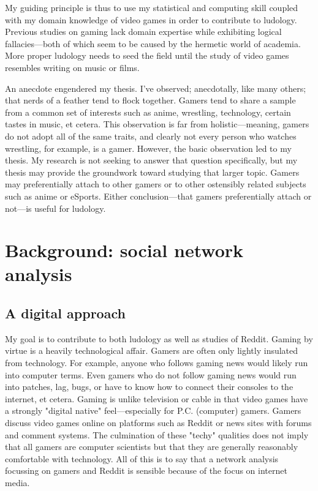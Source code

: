 \documentclass[12pt, a4paper]{article}
\begin{document}
My guiding principle is thus to use my statistical and computing skill coupled with my domain knowledge of video games in order to contribute to ludology. Previous studies on gaming lack domain expertise while exhibiting logical fallacies---both of which seem to be caused by the hermetic world of academia. More proper ludology needs to seed the field until the study of video games resembles writing on music or films. 

An anecdote engendered my thesis. I've observed; anecdotally, like many others; that nerds of a feather tend to flock together. Gamers tend to share a sample from a common set of interests such as anime, wrestling, technology, certain tastes in music, et cetera. This observation is far from holistic---meaning, gamers do not adopt all of the same traits, and clearly not every person who watches wrestling, for example, is a gamer. However, the basic observation led to my thesis. My research is not seeking to answer that question specifically, but my thesis may provide the groundwork toward studying that larger topic. Gamers may preferentially attach to other gamers or to other ostensibly related subjects such as anime or eSports. Either conclusion---that gamers preferentially attach or not---is useful for ludology. 

\section{Background: social network analysis}

\subsection{A digital approach}
My goal is to contribute to both ludology as well as studies of Reddit. Gaming by virtue is a heavily technological affair. Gamers are often only lightly insulated from technology. For example, anyone who follows gaming news would likely run into computer terms. Even gamers who do not follow gaming news would run into patches, lag, bugs, or have to know how to connect their consoles to the internet, et cetera. Gaming is unlike television or cable in that video games have a strongly "digital native" feel---especially for P.C. (computer) gamers. Gamers discuss video games online on platforms such as Reddit or news sites with forums and comment systems. The culmination of these "techy" qualities does not imply that all gamers are computer scientists but that they are generally reasonably comfortable with technology. All of this is to say that a network analysis focussing on gamers and Reddit is sensible because of the focus on internet media.
\end{document}
